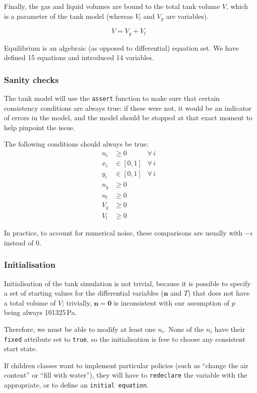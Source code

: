 \documentclass[a4paper]{article}
\begin{document}
Finally, the gas and liquid volumes are bound to the total tank volume $V$,
which is a parameter of the tank model (whereas $V_l$ and $V_g$ are variables).

\begin{equation}
V = V_g + V_l
\end{equation}

Equilibrium is an algebraic (as opposed to differential) equation set. We have
defined 15 equations and introduced 14 variables.

\subsubsection{Sanity checks}
The tank model will use the \texttt{assert} function to make sure that certain
consistency conditions are always true: if these were not, it would be an
indicator of errors in the model, and the model should be stopped at that exact
moment to help pinpoint the issue.

The following conditions should always be true:
\begin{align}
n_i & \geq 0 & \forall \, i\\
x_i & \in [0,1] & \forall \, i\\
y_i & \in [0,1] & \forall \, i\\
n_g & \geq 0\\
n_l & \geq 0\\
V_g & \geq 0\\
V_l & \geq 0
\end{align}

In practice, to account for numerical noise, these comparisons are usually
with $-\epsilon$ instead of 0.

\subsubsection{Initialisation}
Initialisation of the tank simulation is not trivial, because it is possible to
specify a set of starting values for the differential variables ($\mathbf{n}$
and $T$) that does not have a total volume of $V$; trivially, $\mathbf{n} =
\mathbf{0}$ is inconsistent with our assumption of $p$ being always 101325\,Pa.

Therefore, we must be able to modify at least one $n_i$. None of the $n_i$ have
their \texttt{fixed} attribute set to \texttt{true}, so the initialisation is
free to choose any consistent start state.

If children classes want to implement particular policies (such as ``change the
air content'' or ``fill with water''), they will have to \texttt{redeclare} the
variable with the appropriate, or to define an \texttt{initial equation}.
\end{document}
